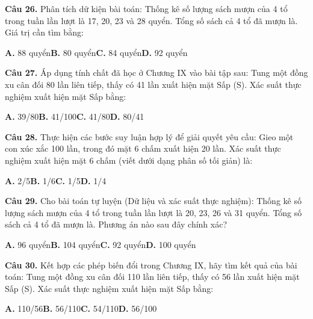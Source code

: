 \documentclass[11pt,a4paper]{article}
\begin{document}
\textbf{\color{primary} Câu 26.} Phân tích dữ kiện bài toán: Thống kê số lượng sách mượn của 4 tổ trong tuần lần lượt là 17, 20, 23 và 28 quyển. Tổng số sách cả 4 tổ đã mượn là. Giá trị cần tìm bằng:\par
\hspace*{1.5em}\textbf{A.} 88 quyển\quad\quad \textbf{B.} 80 quyển\quad\quad \textbf{C.} 84 quyển\quad\quad \textbf{D.} 92 quyển\par\vspace{2pt}
\textbf{\color{primary} Câu 27.} Áp dụng tính chất đã học ở Chương IX vào bài tập sau: Tung một đồng xu cân đối 80 lần liên tiếp, thấy có 41 lần xuất hiện mặt Sấp (S). Xác suất thực nghiệm xuất hiện mặt Sấp bằng:\par
\hspace*{1.5em}\textbf{A.} 39/80\quad\quad \textbf{B.} 41/100\quad\quad \textbf{C.} 41/80\quad\quad \textbf{D.} 80/41\par\vspace{2pt}
\textbf{\color{primary} Câu 28.} Thực hiện các bước suy luận hợp lý để giải quyết yêu cầu: Gieo một con xúc xắc 100 lần, trong đó mặt 6 chấm xuất hiện 20 lần. Xác suất thực nghiệm xuất hiện mặt 6 chấm (viết dưới dạng phân số tối giản) là:\par
\hspace*{1.5em}\textbf{A.} 2/5\quad\quad \textbf{B.} 1/6\quad\quad \textbf{C.} 1/5\quad\quad \textbf{D.} 1/4\par\vspace{2pt}
\textbf{\color{primary} Câu 29.} Cho bài toán tự luyện (Dữ liệu và xác suất thực nghiệm): Thống kê số lượng sách mượn của 4 tổ trong tuần lần lượt là 20, 23, 26 và 31 quyển. Tổng số sách cả 4 tổ đã mượn là. Phương án nào sau đây chính xác?\par
\hspace*{1.5em}\textbf{A.} 96 quyển\quad\quad \textbf{B.} 104 quyển\quad\quad \textbf{C.} 92 quyển\quad\quad \textbf{D.} 100 quyển\par\vspace{2pt}
\textbf{\color{primary} Câu 30.} Kết hợp các phép biến đổi trong Chương IX, hãy tìm kết quả của bài toán: Tung một đồng xu cân đối 110 lần liên tiếp, thấy có 56 lần xuất hiện mặt Sấp (S). Xác suất thực nghiệm xuất hiện mặt Sấp bằng:\par
\hspace*{1.5em}\textbf{A.} 110/56\quad\quad \textbf{B.} 56/110\quad\quad \textbf{C.} 54/110\quad\quad \textbf{D.} 56/100\par\vspace{2pt}
\end{document}
